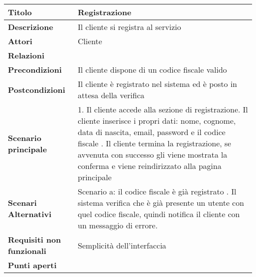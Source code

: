 \begin{tabular} {|P{4.5cm}|P{12.5cm}|}
\hline
    \textbf{Titolo} & Registrazione\\
\hline
  \textbf{Descrizione} & Il cliente si registra al servizio\\
\hline
  \textbf{Attori} & Cliente\\
\hline
  \textbf{Relazioni} &\\
\hline
\textbf{Precondizioni} & Il cliente dispone di un codice fiscale valido\\
\hline
  \textbf{Postcondizioni} & Il cliente è registrato nel sistema ed è posto in attesa della verifica\\
\hline
  \textbf{Scenario principale} & 1. Il cliente accede alla sezione di registrazione. Il cliente inserisce i propri dati: nome, cognome, data di nascita, email, password e il codice fiscale . Il cliente termina la registrazione, se avvenuta con successo gli viene mostrata la conferma e viene reindirizzato alla pagina principale\\
\hline
  \textbf{Scenari Alternativi} & Scenario a: il codice fiscale è già registrato . Il sistema verifica che è già presente un utente con quel codice fiscale, quindi notifica il cliente con un messaggio di errore.\\
\hline
  \textbf{Requisiti non funzionali} & Semplicità dell'interfaccia\\
\hline
  \textbf{Punti aperti} &\\
\hline
\end{tabular}
\hfill
\break


